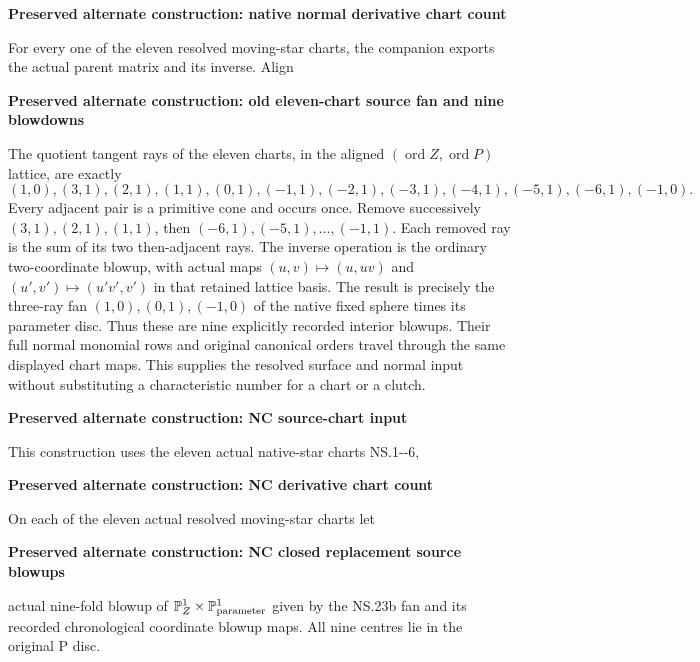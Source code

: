 \par\bigskip\noindent\textbf{Preserved alternate construction: native normal derivative chart count}\par
For every one of the eleven resolved moving-star charts, the
companion exports the actual parent matrix and its inverse. Align

\par\bigskip\noindent\textbf{Preserved alternate construction: old eleven-chart source fan and nine blowdowns}\par
The quotient tangent rays of the eleven charts, in the aligned
\((\operatorname{ord}Z,\operatorname{ord}P)\) lattice, are exactly
\[
 (1,0),(3,1),(2,1),(1,1),(0,1),(-1,1),(-2,1),(-3,1),
                 (-4,1),(-5,1),(-6,1),(-1,0).
 \tag{NS.23b}
\]
Every adjacent pair is a primitive cone and occurs once. Remove
successively \((3,1),(2,1),(1,1)\), then
\((-6,1),(-5,1),\ldots,(-1,1)\). Each removed ray is the sum of
its two then-adjacent rays. The inverse operation is the ordinary
two-coordinate blowup, with actual maps \((u,v)\mapsto(u,uv)\)
and \((u',v')\mapsto(u'v',v')\) in that retained lattice basis.
The result is precisely the three-ray fan
\((1,0),(0,1),(-1,0)\) of the native fixed sphere times its
parameter disc. Thus these are nine explicitly recorded interior
blowups. Their full normal monomial rows and original canonical
orders travel through the same displayed chart maps. This supplies
the resolved surface and normal input without substituting a
characteristic number for a chart or a clutch.



\par\bigskip\noindent\textbf{Preserved alternate construction: NC source-chart input}\par
This construction uses the eleven actual native-star charts NS.1-\/-6,

\par\bigskip\noindent\textbf{Preserved alternate construction: NC derivative chart count}\par
On each of the eleven actual resolved moving-star charts let

\par\bigskip\noindent\textbf{Preserved alternate construction: NC closed replacement source blowups}\par
actual nine-fold blowup of \(\mathbb P^1_Z\times \mathbb P^1_{\rm parameter}\) given by the
NS.23b fan and its recorded chronological coordinate blowup maps.
All nine centres lie in the original P disc.

